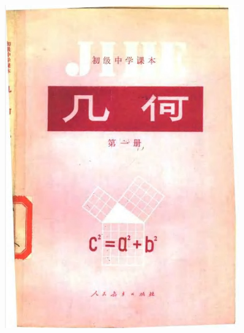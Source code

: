 \begin{titlepage}
    \begin{figure}[htbp]
        \centering
        \includegraphics[width=0.9\textwidth]{../pic/czjh1-cover}
    \end{figure}

 \end{titlepage}
